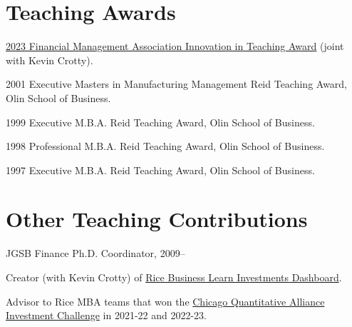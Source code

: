 \documentclass[margin, 11pt]{res}
\newenvironment{list1}{
  \begin{list}{}{%
            \setlength{\itemsep}{0in}
      \setlength{\parsep}{0in} \setlength{\parskip}{0in}
      \setlength{\topsep}{0in} \setlength{\partopsep}{0in}
      \setlength{\leftmargin}{0.2in}}}{\end{list}}
\newenvironment{list3}{
  \begin{list}{}{%
            \setlength{\itemsep}{0in}
      \setlength{\parsep}{0in} \setlength{\parskip}{0in}
      \setlength{\topsep}{0in} \setlength{\partopsep}{0in}
      \setlength{\leftmargin}{0.2in}}}{\vspace*{.15in}\end{list}}
\begin{document}
\begin{resume}
\begin{list1}
\begin{list3}
 
 
\end{list3}
\vspace*{-.15in}
\end{list1}

\section{\sc Teaching Awards}
\begin{list1}
  \item \href{https://www.fma.org/iita2023}{2023 Financial Management Association Innovation in Teaching Award} (joint with Kevin Crotty).
\item 2001 Executive Masters in Manufacturing Management Reid Teaching Award, Olin School of Business.
\item 1999 Executive M.B.A. Reid Teaching Award, Olin School of Business.
 \item 1998 Professional M.B.A. Reid Teaching Award, Olin School of Business.
 \item 1997 Executive M.B.A. Reid Teaching Award, Olin School of Business.
\end{list1}

\newpage

\section{\sc Other Teaching Contributions}
\begin{list1}
  \item JGSB Finance Ph.D. Coordinator, 2009--
\item Creator (with Kevin Crotty) of \href{http://learn-investments.rice-business.org}{Rice Business Learn Investments Dashboard}.
\item Advisor to Rice MBA teams that won the \href{https://www.cqa.org/investment_challenge}{Chicago Quantitative Alliance Investment Challenge} in 2021-22 and 2022-23.
\end{list1}


\end{resume}
\end{document}
